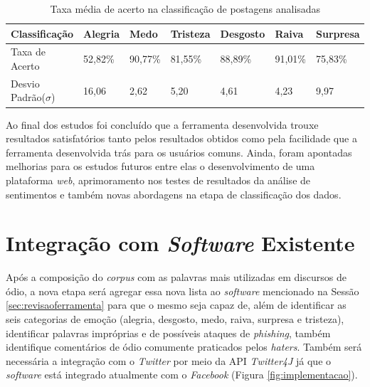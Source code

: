 \begin{table}[h!]
  \begin{center}
    \caption{Taxa média de acerto na classificação de postagens analisadas}
    \label{tab:taxaacerto}
    \begin{tabular}{lllllll} %
      \textbf{Classificação} & \textbf{Alegria} & \textbf{Medo} & \textbf{Tristeza} & \textbf{Desgosto} & \textbf{Raiva} & \textbf{Surpresa}\\
      \hline
      Taxa de Acerto&52,82\%&90,77\%&81,55\%&88,89\%&91,01\%&75,83\%\\
      Desvio Padrão($\sigma$)&16,06&2,62&5,20&4,61&4,23&9,97\\
      \hline
    \end{tabular}
  \end{center}
\end{table}

Ao final dos estudos foi concluído que a ferramenta desenvolvida trouxe resultados satisfatórios tanto pelos resultados obtidos como pela facilidade que a ferramenta desenvolvida trás para os usuários comuns. Ainda, foram apontadas melhorias para os estudos futuros entre elas o desenvolvimento de uma plataforma \textit{web}, aprimoramento nos testes de resultados da análise de sentimentos e também novas abordagens na etapa de classificação dos dados. 

\section{Integração com \textit{Software} Existente}
\label{sec:integracaosoftware}
Após a composição do \textit{corpus} com as palavras mais utilizadas em discursos de ódio, a nova etapa será agregar essa nova lista ao \textit{software} mencionado na Sessão \ref{sec:revisaoferramenta} para que o mesmo seja capaz de, além de identificar as seis categorias de emoção (alegria, desgosto, medo, raiva, surpresa e tristeza), identificar palavras impróprias e de possíveis ataques de \textit{phishing}, também identifique comentários de ódio comumente praticados pelos \textit{haters}.
Também será necessária a integração com o \textit{Twitter} por meio da API \textit{Twitter4J} já que o \textit{software} está integrado atualmente com o \textit{Facebook} (Figura \ref{fig:implementacao}). 

